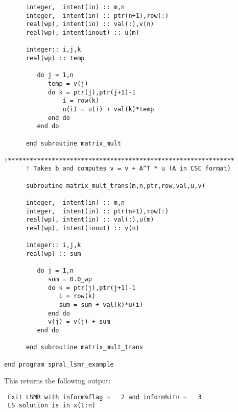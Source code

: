 \begin{verbatim}
      integer,  intent(in) :: m,n
      integer,  intent(in) :: ptr(n+1),row(:)
      real(wp), intent(in) :: val(:),v(n)
      real(wp), intent(inout) :: u(m)

      integer:: i,j,k
      real(wp) :: temp
    
         do j = 1,n
            temp = v(j)
            do k = ptr(j),ptr(j+1)-1
                i = row(k)
                u(i) = u(i) + val(k)*temp
            end do
         end do

      end subroutine matrix_mult

!**************************************************************
      ! Takes b and computes v = v + A^T * u (A in CSC format)

      subroutine matrix_mult_trans(m,n,ptr,row,val,u,v)

      integer,  intent(in) :: m,n
      integer,  intent(in) :: ptr(n+1),row(:)
      real(wp), intent(in) :: val(:),u(m)
      real(wp), intent(inout) :: v(n)

      integer:: i,j,k
      real(wp) :: sum
      
         do j = 1,n
            sum = 0.0_wp
            do k = ptr(j),ptr(j+1)-1
               i = row(k)
               sum = sum + val(k)*u(i)
            end do
            v(j) = v(j) + sum
         end do

      end subroutine matrix_mult_trans

end program spral_lsmr_example
\end{verbatim}


This returns the following output:

\begin{verbatim}
 Exit LSMR with inform%flag =   2 and inform%itn =   3
 LS solution is in x(1:n)
\end{verbatim}

\begin{funders}
\end{funders}
